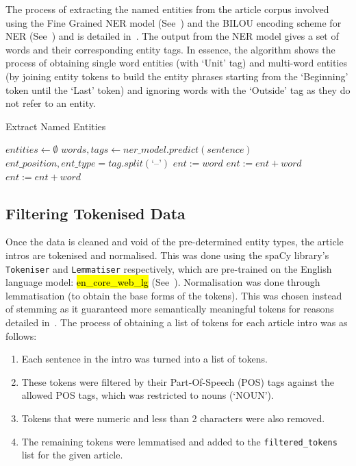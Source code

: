 The process of extracting the named entities from the article corpus involved using the Fine Grained NER model (See~) and the BILOU encoding scheme for NER (See~) and is detailed in~. The output from the NER model gives a set of words and their corresponding entity tags. In essence, the algorithm shows the process of obtaining single word entities (with `Unit' tag) and multi-word entities (by joining entity tokens to build the entity phrases starting from the `Beginning' token until the `Last' token) and ignoring words with the `Outside' tag as they do not refer to an entity.

\begin{algorithm}[H]
  \caption{Extract Named Entities}
  \label{alg:named_ents}
  \begin{algorithmic}   
  \State $\mathit{entities} \leftarrow \emptyset$
  \State $\mathit{words, tags} \leftarrow \mathit{ner\_model.predict}(sentence)$
        \EndIf
    \State $ \mathit{ent\_position, ent\_type} = \mathit{tag.split}(\text{`--'})$
    \Else
      \State $ent := word$
      \State  $\mathit{ent:= ent + word}$
      \State  $\mathit{ent := ent + word} $
      \EndIf
    \EndIf
  \EndFor
\end{algorithmic}
\end{algorithm}

\subsection{Filtering Tokenised Data} \label{filtered_tokens}
Once the data is cleaned and void of the pre-determined entity types, the article intros are tokenised and normalised. This was done using the spaCy library's \texttt{Tokeniser} and \texttt{Lemmatiser} respectively, which are pre-trained on the English language model: \hl{en\_core\_web\_lg} (See~). Normalisation was done through lemmatisation (to obtain the base forms of the tokens). This was chosen instead of stemming as it guaranteed more semantically meaningful tokens for reasons detailed in~. The process of obtaining a list of tokens for each article intro was as follows:
\begin{enumerate}
    \item Each sentence in the intro was turned into a list of tokens.
    \item These tokens were filtered by their Part-Of-Speech (POS) tags against the allowed POS tags, which was restricted to nouns (`NOUN').
    \item Tokens that were numeric and less than 2 characters were also removed. 
    \item The remaining tokens were lemmatised and added to the \texttt{filtered\_tokens} list for the given article.
\end{enumerate}

